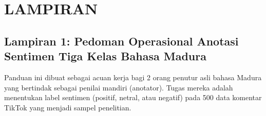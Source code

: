 
\clearpage
{}
\chapter*{LAMPIRAN}

\vspace{0.3cm}

\section*{Lampiran 1: Pedoman Operasional Anotasi Sentimen Tiga Kelas Bahasa Madura}

Panduan ini dibuat sebagai acuan kerja bagi 2 orang penutur asli bahasa Madura yang bertindak sebagai penilai mandiri (anotator). Tugas mereka adalah menentukan label sentimen (positif, netral, atau negatif) pada 500 data komentar TikTok yang menjadi sampel penelitian.

